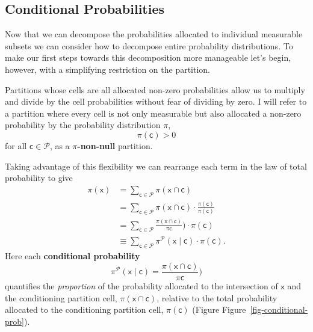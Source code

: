 \documentclass[
  letterpaper,
  DIV=11,
  numbers=noendperiod]{scrartcl}
\begin{document}
\subsection{Conditional Probabilities}\label{conditional-probabilities}

Now that we can decompose the probabilities allocated to individual
measurable subsets we can consider how to decompose entire probability
distributions. To make our first steps towards this decomposition more
manageable let's begin, however, with a simplifying restriction on the
partition.

Partitions whose cells are all allocated non-zero probabilities allow us
to multiply and divide by the cell probabilities without fear of
dividing by zero. I will refer to a partition where every cell is not
only measurable but also allocated a non-zero probability by the
probability distribution \(\pi\), \[
\pi(\mathsf{c}) > 0
\] for all \(\mathsf{c} \in \mathcal{P}\), as a
\textbf{\(\pi\)-non-null} partition.

Taking advantage of this flexibility we can rearrange each term in the
law of total probability to give \begin{align*}
\pi( \mathsf{x} )
&=
\sum_{\mathsf{c} \in \mathcal{P}} \pi( \mathsf{x} \cap \mathsf{c} )
\\
&=
\sum_{\mathsf{c} \in \mathcal{P}} \pi( \mathsf{x} \cap \mathsf{c} )
\cdot \frac{ \pi( \mathsf{c} ) }{ \pi( \mathsf{c} ) }
\\
&=
\sum_{\mathsf{c} \in \mathcal{P}}
\frac{ \pi(\mathsf{x} \cap \mathsf{c}) }{ \pi \mathsf{c} })
\cdot \pi( \mathsf{c} )
\\
&\equiv
\sum_{\mathsf{c} \in \mathcal{P}}
\pi^{\mathcal{P}}( \mathsf{x} \mid \mathsf{c} )
\cdot \pi( \mathsf{c} ).
\end{align*} Here each \textbf{conditional probability} \[
\pi^{\mathcal{P}}( \mathsf{x} \mid \mathsf{c} ) =
\frac{ \pi(\mathsf{x} \cap \mathsf{c}) }{ \pi \mathsf{c} })
\] quantifies the \emph{proportion} of the probability allocated to the
intersection of \(\mathsf{x}\) and the conditioning partition cell,
\(\pi(\mathsf{x} \cap \mathsf{c})\), relative to the total probability
allocated to the conditioning partition cell, \(\pi( \mathsf{c} )\)
(Figure Figure~\ref{fig-conditional-prob}).
\end{document}
